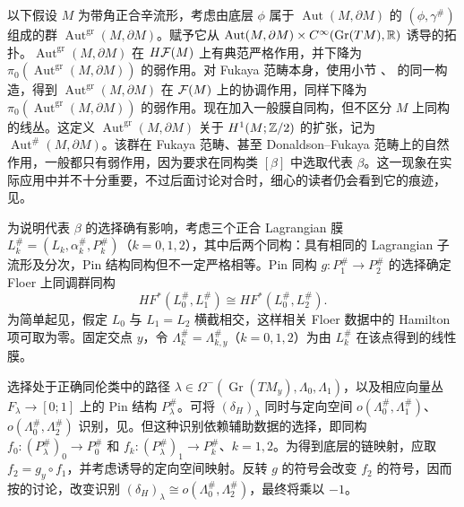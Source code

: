 以下假设 $M$ 为带角正合辛流形，考虑由底层 $\phi$ 属于 $\operatorname{Aut}(M,\allowbreak \partial M)$ 的 $(\phi,\allowbreak \gamma^\#)$ 组成的群 $\operatorname{Aut}^{\mathrm{gr}}(M,\allowbreak \partial M)$。赋予它从 $\operatorname{Aut}(M,\allowbreak \partial M)\times C^\infty(\operatorname{Gr}(TM),\allowbreak \mathbb R)$ 诱导的拓扑。$\operatorname{Aut}^{\mathrm{gr}}(M,\allowbreak \partial M)$ 在 $H\mathcal F(M)$ 上有典范严格作用，并下降为 $\pi_0(\operatorname{Aut}^{\mathrm{gr}}(M,\allowbreak \partial M))$ 的弱作用。对 Fukaya 范畴本身，使用小节 、 的同一构造，得到 $\operatorname{Aut}^{\mathrm{gr}}(M,\allowbreak \partial M)$ 在 $\mathcal F(M)$ 上的协调作用，同样下降为 $\pi_0(\operatorname{Aut}^{\mathrm{gr}}(M,\allowbreak \partial M))$ 的弱作用。现在加入一般膜自同构，但不区分 $M$ 上同构的线丛。这定义 $\operatorname{Aut}^{\mathrm{gr}}(M,\allowbreak \partial M)$ 关于 $H^1(M;\mathbb Z/2)$ 的扩张，记为 $\operatorname{Aut}^\#(M,\allowbreak \partial M)$。该群在 Fukaya 范畴、甚至 Donaldson–Fukaya 范畴上的自然作用，一般都只有弱作用，因为要求在同构类 $[\beta]$ 中选取代表 $\beta$。这一现象在实际应用中并不十分重要，不过后面讨论对合时，细心的读者仍会看到它的痕迹，见。
\begin{note}\label{st:12.5}
为说明代表 $\beta$ 的选择确有影响，考虑三个正合 Lagrangian 膜 $L_k^\#=(L_k,\allowbreak \alpha_k^\#,\allowbreak P_k^\#)$（$k=0,\allowbreak 1,\allowbreak 2$），其中后两个同构：具有相同的 Lagrangian 子流形及分次，Pin 结构同构但不一定严格相等。Pin 同构 $g:P_1^\#\to P_2^\#$ 的选择确定 Floer 上同调群同构
\begin{equation}\label{eq:12.30}
HF^*(L_0^\#,L_1^\#)\cong HF^*(L_0^\#,L_2^\#).
\end{equation}
为简单起见，假定 $L_0$ 与 $L_1=L_2$ 横截相交，这样相关 Floer 数据中的 Hamilton 项可取为零。固定交点 $y$，令 $\Lambda_k^\#=\Lambda_{k,\allowbreak y}^\#$（$k=0,\allowbreak 1,\allowbreak 2$）为由 $L_k^\#$ 在该点得到的线性膜。

选择处于正确同伦类中的路径 $\lambda\in\Omega^-(\operatorname{Gr}(TM_y),\allowbreak \Lambda_0,\allowbreak \Lambda_1)$，以及相应向量丛 $F_\lambda\to[0;1]$ 上的 Pin 结构 $P_\lambda^\#$。可将
$(\delta_H)_\lambda$ 同时与定向空间 $o(\Lambda_0^\#,\allowbreak \Lambda_1^\#)$、$o(\Lambda_0^\#,\allowbreak \Lambda_2^\#)$ 识别，见。但这种识别依赖辅助数据的选择，即同构 $f_0:(P_\lambda^\#)_0\to P_0^\#$ 和 $f_k:(P_\lambda^\#)_1\to P_k^\#$、$k=1,\allowbreak 2$。为得到底层的链映射，应取 $f_2=g_y\circ f_1$，并考虑诱导的定向空间映射。反转 $g$ 的符号会改变 $f_2$ 的符号，因而按的讨论，改变识别 $(\delta_H)_\lambda\cong o(\Lambda_0^\#,\allowbreak \Lambda_2^\#)$，最终将乘以 $-1$。
\end{note}

